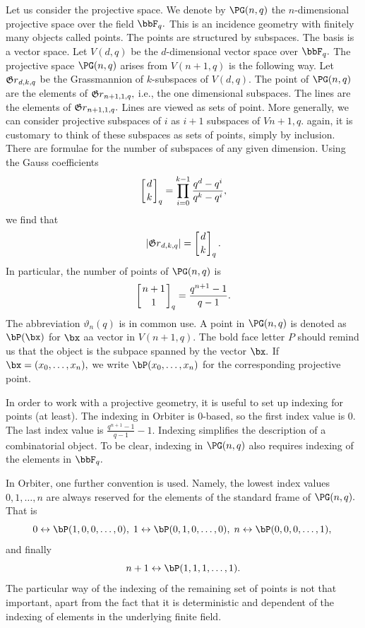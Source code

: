 \documentclass[10pt]{article}
\begin{document}
Let us consider the projective space. 
We denote by $\PG(n,q)$ the $n$-dimensional projective space over the field $\bbF_q.$ This is an incidence geometry with finitely many objects called points. The points are structured by subspaces. The basis is a vector space. Let $V(d,q)$ be the $d$-dimensional vector space over $\bbF_q.$ The projective space $\PG(n,q)$ arises from $V(n+1,q)$ is the following way. Let 
${\frak Gr}_{d,k,q}$ be the Grassmannion of $k$-subspaces of $V(d,q).$ The point of $\PG(n,q)$
are the elements of ${\frak Gr}_{n+1,1,q},$ i.e., the one dimensional subspaces. 
The lines are the elements of ${\frak Gr}_{n+1,1,q}.$ Lines are viewed as sets of point. 
More generally, we can consider projective subspaces of $i$ as $i+1$ subspaces of $V{n+1,q}.$ 
again, it is customary to think of these subspaces as sets of points, simply by inclusion. 
There are formulae for the number of subspaces of any given dimension. 
Using the Gauss coefficients
$$
\left[ {d\atop k} \right]_q = \prod_{i=0}^{k-1} \frac{q^d-q^i}{q^k-q^i},
$$
we find that 
$$
|{\frak Gr}_{d,k,q}| = 
\left[ {d\atop k} \right]_q.
$$
In particular, the number of points of $\PG(n,q)$ is 
$$
\left[ {n+1\atop 1} \right]_q = \frac{q^{n+1}-1}{q-1}.
$$
The abbreviation $\vartheta_n(q)$ is in common use.
A point in $\PG(n,q)$ is denoted as $\bP(\bx)$ for $\bx$ aa vector in $V(n+1,q)$. 
The bold face letter $P$ should remind us that the object is the subpace spanned by the vector $\bx.$
If $\bx = (x_0,\ldots,x_n),$ we write $\bP(x_0,\ldots,x_n)$ for the corresponding projective point. 

\bigskip


In order to work with a projective geometry, 
it is useful to set up indexing for points (at least). 
The indexing in Orbiter is $0$-based, so the first index value is $0$. 
The last index value is $\frac{q^{n+1}-1}{q-1}-1.$ 
Indexing simplifies the description of a combinatorial object. To be clear, indexing in $\PG(n,q)$ 
also requires indexing of the elements in $\bbF_q.$

\bigskip

In Orbiter, one further convention is used. 
Namely, the lowest index values $0,1,\ldots,n$ are 
always reserved for the elements of the standard frame of $\PG(n,q).$ 
That is 
$$
0 \leftrightarrow \bP(1,0,0,\ldots,0), \; 
1 \leftrightarrow \bP(0,1,0,\ldots,0), \; 
n \leftrightarrow \bP(0,0,0,\ldots,1), \; 
$$
and finally
$$
n+1 \leftrightarrow \bP(1,1,1,\ldots,1).
$$
The particular way of the indexing of the remaining set of points is not that important, apart from the fact that it is deterministic and dependent of the indexing of elements in the underlying finite field.
\end{document}
